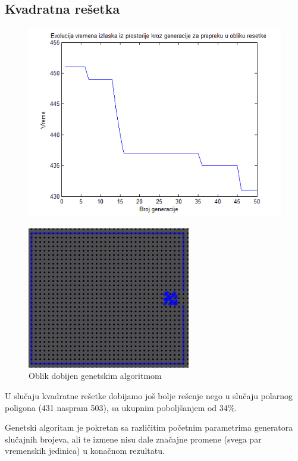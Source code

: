 \documentclass[12pt]{article}
\begin{document}
\subsection*{Kvadratna rešetka} 

\begin{figure}
\centering
\includegraphics[scale=.6]{Grid-plot}
\end{figure}

\begin{figure}
\centering
\includegraphics{grid1}
\caption{Oblik dobijen genetskim algoritmom}
\label{fig:grid1}
\end{figure}

U slučaju kvadratne rešetke dobijamo još bolje rešenje nego u slučaju polarnog poligona (431 naspram 503), sa ukupnim poboljšanjem od $34\%$.

Genetski algoritam je pokretan sa različitim početnim parametrima generatora slučajnih brojeva, ali te izmene nisu dale značajne promene (svega par vremenskih jedinica) u konačnom rezultatu.
\end{document}
